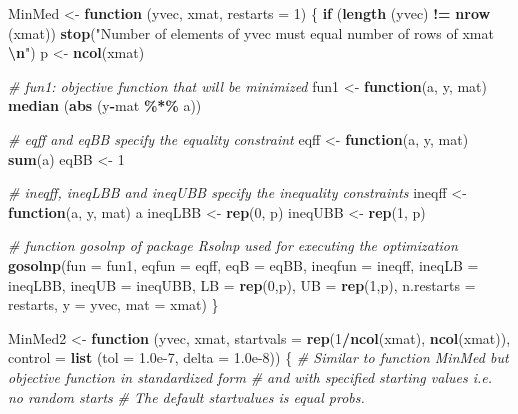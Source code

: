 \documentclass[
]{book}
\newenvironment{Shaded}{\begin{snugshade}}{\end{snugshade}}
\newcommand{\AttributeTok}[1]{\textcolor[rgb]{0.13,0.29,0.53}{#1}}
\newcommand{\CommentTok}[1]{\textcolor[rgb]{0.56,0.35,0.01}{\textit{#1}}}
\newcommand{\ControlFlowTok}[1]{\textcolor[rgb]{0.13,0.29,0.53}{\textbf{#1}}}
\newcommand{\DecValTok}[1]{\textcolor[rgb]{0.00,0.00,0.81}{#1}}
\newcommand{\FloatTok}[1]{\textcolor[rgb]{0.00,0.00,0.81}{#1}}
\newcommand{\FunctionTok}[1]{\textcolor[rgb]{0.13,0.29,0.53}{\textbf{#1}}}
\newcommand{\NormalTok}[1]{#1}
\newcommand{\OtherTok}[1]{\textcolor[rgb]{0.56,0.35,0.01}{#1}}
\newcommand{\SpecialCharTok}[1]{\textcolor[rgb]{0.81,0.36,0.00}{\textbf{#1}}}
\newcommand{\StringTok}[1]{\textcolor[rgb]{0.31,0.60,0.02}{#1}}
\begin{document}
\begin{Shaded}
\begin{Highlighting}[]
\NormalTok{MinMed }\OtherTok{\textless{}{-}} \ControlFlowTok{function}\NormalTok{ (yvec, xmat, }\AttributeTok{restarts =} \DecValTok{1}\NormalTok{) }
\NormalTok{\{ }\ControlFlowTok{if}\NormalTok{ (}\FunctionTok{length}\NormalTok{ (yvec) }\SpecialCharTok{!=} \FunctionTok{nrow}\NormalTok{ (xmat)) }
    \FunctionTok{stop}\NormalTok{(}\StringTok{"Number of elements of yvec must equal number of   rows of xmat }\SpecialCharTok{\textbackslash{}n}\StringTok{"}\NormalTok{)}
\NormalTok{  p }\OtherTok{\textless{}{-}} \FunctionTok{ncol}\NormalTok{(xmat)}

  \CommentTok{\# fun1: objective function that will be minimized}
\NormalTok{  fun1 }\OtherTok{\textless{}{-}} \ControlFlowTok{function}\NormalTok{(a, y, mat) }\FunctionTok{median}\NormalTok{ (}\FunctionTok{abs}\NormalTok{ (y}\SpecialCharTok{{-}}\NormalTok{mat }\SpecialCharTok{\%*\%}\NormalTok{ a)) }

  \CommentTok{\# eqff and eqBB specify the equality constraint}
\NormalTok{  eqff }\OtherTok{\textless{}{-}} \ControlFlowTok{function}\NormalTok{(a, y, mat) }\FunctionTok{sum}\NormalTok{(a)}
\NormalTok{  eqBB }\OtherTok{\textless{}{-}} \DecValTok{1}

  \CommentTok{\# ineqff, ineqLBB and ineqUBB specify the inequality constraints}
\NormalTok{  ineqff }\OtherTok{\textless{}{-}} \ControlFlowTok{function}\NormalTok{(a, y, mat) a}
\NormalTok{  ineqLBB }\OtherTok{\textless{}{-}} \FunctionTok{rep}\NormalTok{(}\DecValTok{0}\NormalTok{, p)}
\NormalTok{  ineqUBB }\OtherTok{\textless{}{-}} \FunctionTok{rep}\NormalTok{(}\DecValTok{1}\NormalTok{, p)}

  \CommentTok{\# function gosolnp of package Rsolnp used for executing the optimization}
  \FunctionTok{gosolnp}\NormalTok{(}\AttributeTok{fun =}\NormalTok{ fun1, }\AttributeTok{eqfun =}\NormalTok{ eqff, }\AttributeTok{eqB  =}\NormalTok{ eqBB, }\AttributeTok{ineqfun =}\NormalTok{ ineqff, }
          \AttributeTok{ineqLB =}\NormalTok{ ineqLBB, }\AttributeTok{ineqUB =}\NormalTok{ ineqUBB, }\AttributeTok{LB =} \FunctionTok{rep}\NormalTok{(}\DecValTok{0}\NormalTok{,p), }\AttributeTok{UB =} \FunctionTok{rep}\NormalTok{(}\DecValTok{1}\NormalTok{,p), }
          \AttributeTok{n.restarts =}\NormalTok{ restarts, }\AttributeTok{y =}\NormalTok{ yvec, }\AttributeTok{mat =}\NormalTok{ xmat)  }
\NormalTok{\}}

\NormalTok{MinMed2 }\OtherTok{\textless{}{-}} \ControlFlowTok{function}\NormalTok{ (yvec, xmat, }\AttributeTok{startvals =} \FunctionTok{rep}\NormalTok{(}\DecValTok{1}\SpecialCharTok{/}\FunctionTok{ncol}\NormalTok{(xmat), }\FunctionTok{ncol}\NormalTok{(xmat)), }
                     \AttributeTok{control =} \FunctionTok{list}\NormalTok{ (}\AttributeTok{tol =} \FloatTok{1.0e{-}7}\NormalTok{, }\AttributeTok{delta =} \FloatTok{1.0e{-}8}\NormalTok{)) }
\NormalTok{\{ }\CommentTok{\# Similar to function MinMed but objective function in standardized form}
  \CommentTok{\# and with specified starting values i.e. no random starts}
  \CommentTok{\# The default startvalues is equal probs. }


\end{Highlighting}
\end{Shaded}
\end{document}
